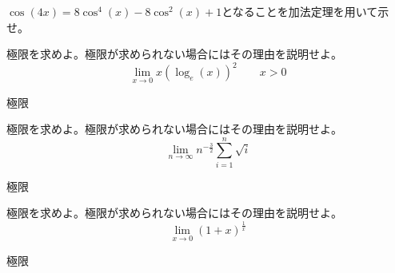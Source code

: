 \documentclass[times, 10pt,dvipdfmx]{jsarticle}
\newcommand{\ah}{\vspace{8cm}}
\newcommand{\anscol}{\underline{\hspace{6cm}}}
\begin{document}
\begin{qlist}
\qitem $\cos(4x)=8\cos^4(x) - 8\cos^2(x) + 1$となることを加法定理を用いて示せ。
\ah
\end{qlist}

\begin{qlist}
\qitem 極限を求めよ。極限が求められない場合にはその理由を説明せよ。
\begin{equation}
\lim_{x \to 0} x (\log_e (x))^2  \qquad   x > 0 \nonumber
\end{equation}

\vspace{5mm}%
極限\anscol
\ah
\end{qlist}
\begin{qlist}
\qitem 極限を求めよ。極限が求められない場合にはその理由を説明せよ。
\begin{equation}
\lim_{n \to \infty}  n^{-\frac{3}{2}} \sum_{i=1}^n \sqrt{i}  \nonumber 
\end{equation}

\vspace{5mm}%
極限\anscol
\ah
\end{qlist}
%
\begin{qlist}
\qitem 極限を求めよ。極限が求められない場合にはその理由を説明せよ。
\begin{equation}
\lim_{x\to 0} \left(1+x\right)^\frac{1}{x} \nonumber 
\end{equation}

\vspace{5mm}
極限\anscol
\ah
\end{qlist}
\end{document}
